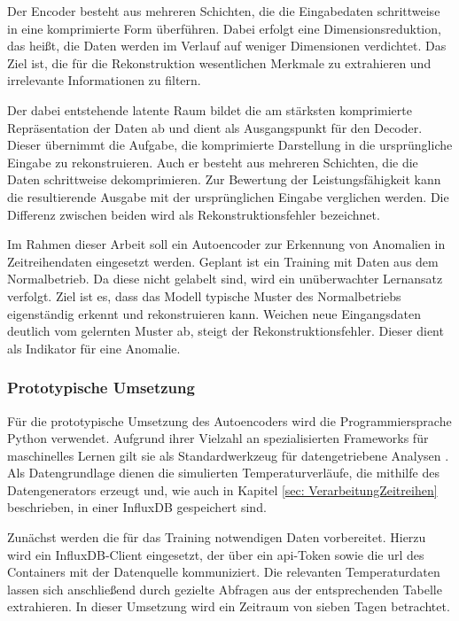 Der Encoder besteht aus mehreren Schichten, die die Eingabedaten schrittweise in eine komprimierte Form überführen. 
Dabei erfolgt eine Dimensionsreduktion, das heißt, die Daten werden im Verlauf auf weniger Dimensionen verdichtet. 
Das Ziel ist, die für die Rekonstruktion wesentlichen Merkmale zu extrahieren und irrelevante Informationen zu filtern.

Der dabei entstehende latente Raum bildet die am stärksten komprimierte Repräsentation der Daten ab und dient als Ausgangspunkt für den Decoder.
Dieser übernimmt die Aufgabe, die komprimierte Darstellung in die ursprüngliche Eingabe zu rekonstruieren. 
Auch er besteht aus mehreren Schichten, die die Daten schrittweise dekomprimieren.
Zur Bewertung der Leistungsfähigkeit kann die resultierende Ausgabe mit der ursprünglichen Eingabe verglichen werden. 
Die Differenz zwischen beiden wird als Rekonstruktionsfehler bezeichnet. \cite{Autoencoder}

Im Rahmen dieser Arbeit soll ein Autoencoder zur Erkennung von Anomalien in Zeitreihendaten eingesetzt werden. 
Geplant ist ein Training mit Daten aus dem Normalbetrieb. 
Da diese nicht gelabelt sind, wird ein unüberwachter Lernansatz verfolgt. 
Ziel ist es, dass das Modell typische Muster des Normalbetriebs eigenständig erkennt und rekonstruieren kann. 
Weichen neue Eingangsdaten deutlich vom gelernten Muster ab, steigt der Rekonstruktionsfehler.
Dieser dient als Indikator für eine Anomalie.

\subsubsection{Prototypische Umsetzung}
Für die prototypische Umsetzung des Autoencoders wird die Programmiersprache Python verwendet. 
Aufgrund ihrer Vielzahl an spezialisierten Frameworks für maschinelles Lernen gilt sie als Standardwerkzeug für datengetriebene Analysen \cite{Python}.
Als Datengrundlage dienen die simulierten Temperaturverläufe, die mithilfe des Datengenerators erzeugt und, wie auch in Kapitel \ref{sec: VerarbeitungZeitreihen} beschrieben, in einer InfluxDB gespeichert sind.

Zunächst werden die für das Training notwendigen Daten vorbereitet.
Hierzu wird ein InfluxDB-Client eingesetzt, der über ein \acs{api}-Token sowie die \acs{url} des Containers mit der Datenquelle kommuniziert.
Die relevanten Temperaturdaten lassen sich anschließend durch gezielte Abfragen aus der entsprechenden Tabelle extrahieren.
In dieser Umsetzung wird ein Zeitraum von sieben Tagen betrachtet.

